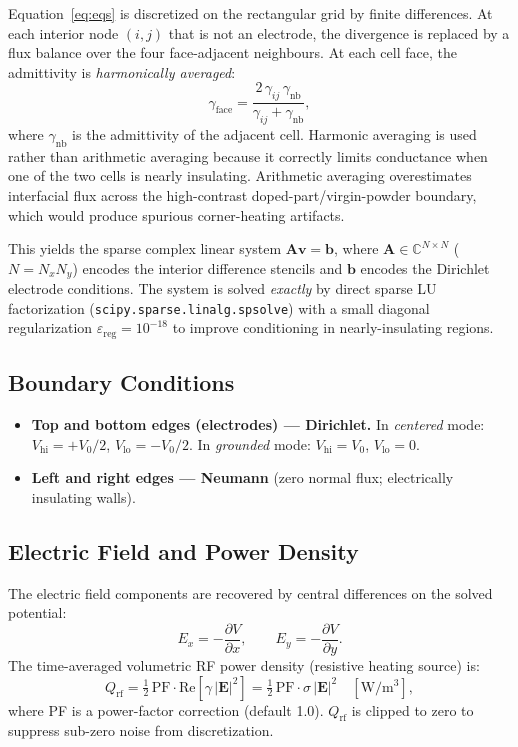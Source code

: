 \documentclass[11pt, letterpaper]{article}
\newcommand{\Qrf}{Q_{\mathrm{rf}}}
\begin{document}
Equation~\eqref{eq:eqs} is discretized on the rectangular grid by finite
differences.
At each interior node $(i,j)$ that is not an electrode, the divergence is
replaced by a flux balance over the four face-adjacent neighbours.
At each cell face, the admittivity is \emph{harmonically averaged}:
%
\begin{equation}
  \gamma_{\mathrm{face}} = \frac{2\,\gamma_{ij}\,\gamma_{\mathrm{nb}}}
                                {\gamma_{ij} + \gamma_{\mathrm{nb}}},
\end{equation}
%
where $\gamma_{\mathrm{nb}}$ is the admittivity of the adjacent cell.
Harmonic averaging is used rather than arithmetic averaging because it correctly
limits conductance when one of the two cells is nearly insulating.
Arithmetic averaging overestimates interfacial flux across the high-contrast
doped-part/virgin-powder boundary, which would produce spurious
corner-heating artifacts.

This yields the sparse complex linear system
$\mathbf{A}\bm{v} = \bm{b}$,
where $\mathbf{A}\in\mathbb{C}^{N\times N}$ ($N = N_x N_y$) encodes the
interior difference stencils and $\bm{b}$ encodes the Dirichlet electrode
conditions.
The system is solved \emph{exactly} by direct sparse LU factorization
(\texttt{scipy.sparse.linalg.spsolve}) with a small diagonal regularization
$\varepsilon_{\mathrm{reg}}=10^{-18}$ to improve conditioning in nearly-insulating
regions.

\subsection{Boundary Conditions}

\begin{itemize}[leftmargin=2em, itemsep=2pt]
  \item \textbf{Top and bottom edges (electrodes) --- Dirichlet.}
    In \emph{centered} mode: $V_\mathrm{hi}=+V_0/2$, $V_\mathrm{lo}=-V_0/2$.
    In \emph{grounded} mode: $V_\mathrm{hi}=V_0$, $V_\mathrm{lo}=0$.
  \item \textbf{Left and right edges --- Neumann} (zero normal flux;
    electrically insulating walls).
\end{itemize}

\subsection{Electric Field and Power Density}

The electric field components are recovered by central differences on the
solved potential:
%
\begin{equation}
  E_x = -\frac{\partial V}{\partial x},\qquad E_y = -\frac{\partial V}{\partial y}.
\end{equation}
%
The time-averaged volumetric RF power density (resistive heating source) is:
%
\begin{equation}
  \label{eq:qrf}
  \Qrf = \tfrac{1}{2}\,\mathrm{PF}\cdot\mathrm{Re}\!\left[\gamma\,|\bm{E}|^2\right]
       = \tfrac{1}{2}\,\mathrm{PF}\cdot\sigma\,|\bm{E}|^2
  \quad[\mathrm{W/m^3}],
\end{equation}
%
where PF is a power-factor correction (default 1.0).
$\Qrf$ is clipped to zero to suppress sub-zero noise from discretization.
\end{document}
